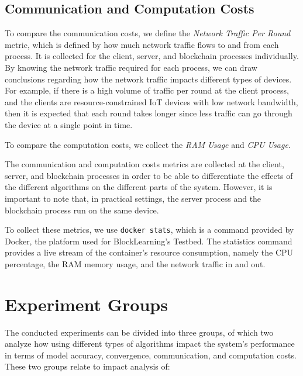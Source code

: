 \subsection{Communication and Computation Costs}

To compare the communication costs, we define the \textit{Network Traffic Per Round} metric, which is defined by how much network traffic flows to and from each process. It is collected for the client, server, and blockchain processes individually. By knowing the network traffic required for each process, we can draw conclusions regarding how the network traffic impacts different types of devices. For example, if there is a high volume of traffic per round at the client process, and the clients are resource-constrained IoT devices with low network bandwidth, then it is expected that each round takes longer since less traffic can go through the device at a single point in time.

To compare the computation costs, we collect the \textit{RAM Usage} and \textit{CPU Usage}.

The communication and computation costs metrics are collected at the client, server, and blockchain processes in order to be able to differentiate the effects of the different algorithms on the different parts of the system. However, it is important to note that, in practical settings, the server process and the blockchain process run on the same device.

To collect these metrics, we use \texttt{docker stats}, which is a command provided by Docker, the platform used for BlockLearning's Testbed. The statistics command provides a live stream of the container's resource consumption, namely the CPU percentage, the RAM memory usage, and the network traffic in and out.

\section{Experiment Groups}\label{meth:experiments}

The conducted experiments can be divided into three groups, of which two analyze how using different types of algorithms impact the system's performance in terms of model accuracy, convergence, communication, and computation costs. These two groups relate to impact analysis of:

